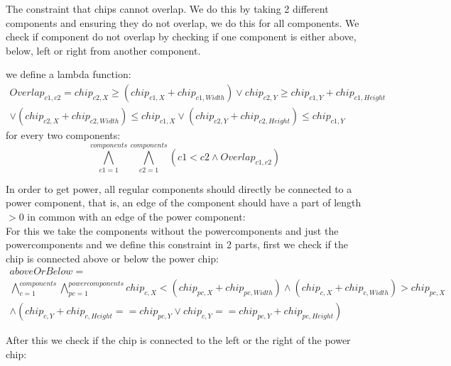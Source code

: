 \documentclass[12pt]{article}
\begin{document}
The constraint that chips cannot overlap. We do this by taking 2 different components and ensuring they do not overlap, we do this for all components. We check if component do not overlap by checking if one component is either above, below, left or right from another component.

we define a lambda function:
\[ \begin{array}{c} Overlap_{c1,c2} = chip_{c2,X} \geq ( chip_{c1,X} + chip_{c1,Width} ) \lor chip_{c2,Y} \geq chip_{c1,Y} + chip_{c1,Height} \\
\lor (chip_{c2,X} + chip_{c2,Width}) \leq chip_{c1,X} \lor ( chip_{c2,Y} + chip_{c2,Height} ) \leq chip_{c1,Y}
\end{array} \]
for every two components:
\[ \bigwedge_{c1=1}^{components} \bigwedge_{c2=1}^{components} \left( c1 < c2 \land Overlap_{c1,c2}\right)  \]

In order to get power, all regular components should directly be connected to a power component, that is, an edge of the component should have a part of length $> 0$ in common with an edge of the power component: \\
For this we take the components without the powercomponents and just the powercomponents and we define this constraint in 2 parts, first we check if the chip is connected above or below the power chip:\\

\[ \begin{array}{c} aboveOrBelow =\\ \bigwedge_{c=1}^{components} \bigwedge_{pc=1}^{powercomponents} chip_{c,X} < (chip_{pc,X} + chip_{pc,Width})  \land (chip_{c,X} + chip_{c,Width}) > chip_{pc,X} \\
\land (chip_{c,Y} + chip_{c,Height} == chip_{pc,Y} \lor chip_{c,Y} == chip_{pc,Y} + chip_{pc,Height})
\end{array} \]

After this we check if the chip is connected to the left or the right of the power chip:\\
\end{document}
